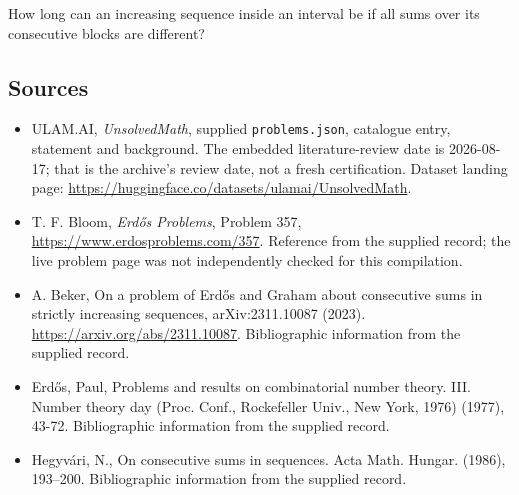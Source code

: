 \documentclass[11pt,a4paper]{article}
\begin{document}
How long can an increasing sequence inside an interval be if all sums over its consecutive blocks are different?

\subsection{Sources}

{\small

\begin{itemize}

\item[\hypertarget{source:statement:1}{S1}] ULAM.AI, \emph{UnsolvedMath}, supplied \texttt{problems.json}, catalogue entry, statement and background. The embedded literature-review date is 2026-08-17; that is the archive’s review date, not a fresh certification. Dataset landing page: \url{https://huggingface.co/datasets/ulamai/UnsolvedMath}.

\item[\hypertarget{source:statement:2}{S2}] T. F. Bloom, \emph{Erdős Problems}, Problem 357, \url{https://www.erdosproblems.com/357}. Reference from the supplied record; the live problem page was not independently checked for this compilation.

\item[\hypertarget{source:statement:3}{S3}] A. Beker, On a problem of Erdős and Graham about consecutive sums in strictly increasing sequences, arXiv:2311.10087 (2023). \url{https://arxiv.org/abs/2311.10087}. Bibliographic information from the supplied record.

\item[\hypertarget{source:statement:4}{S4}] Erd\H{o}s, Paul, Problems and results on combinatorial number theory. III. Number theory day (Proc. Conf., Rockefeller Univ., New York, 1976) (1977), 43-72. Bibliographic information from the supplied record.

\item[\hypertarget{source:statement:5}{S5}] Hegyv\'ari, N., On consecutive sums in sequences. Acta Math. Hungar. (1986), 193--200. Bibliographic information from the supplied record.

\end{itemize}

}

\label{end:statement}
\end{document}
